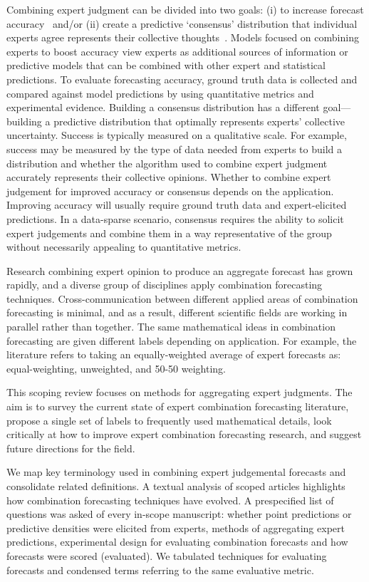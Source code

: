 \documentclass[preprint,authoryear]{elsarticle}
\begin{document}
Combining expert judgment can be divided into two goals: (i) to increase forecast accuracy~\cite{bates1969combination,granger1984improved} and/or (ii) create a predictive `consensus' distribution that individual experts agree represents their collective thoughts~\cite{stone1961opinion,genest1986combining,cooke1991experts}.
Models focused on combining experts to boost accuracy view experts as additional sources of information or predictive models that can be combined with other expert and statistical predictions.
To evaluate forecasting accuracy, ground truth data is collected and compared against model predictions by using quantitative metrics and experimental evidence.
Building a consensus distribution has a different goal---building a predictive distribution that optimally represents experts' collective uncertainty.
Success is typically measured on a qualitative scale.
For example, success may be measured by the type of data needed from experts to build a distribution and whether the algorithm used to combine expert judgment accurately represents their collective opinions.
Whether to combine expert judgement for improved accuracy or consensus depends on the application.
Improving accuracy will usually require ground truth data and expert-elicited predictions.
In a data-sparse scenario, consensus requires the ability to solicit expert judgements and combine them in a way representative of the group without necessarily appealing to quantitative metrics.

Research combining expert opinion to produce an aggregate forecast has grown rapidly, and a diverse group of disciplines apply combination forecasting techniques.
Cross-communication between different applied areas of combination forecasting is minimal, and as a result, different scientific fields are working in parallel rather than together.
The same mathematical ideas in combination forecasting are given different labels depending on application.
For example, the literature refers to taking an equally-weighted average of expert forecasts as: equal-weighting, unweighted, and 50-50 weighting.

This scoping review focuses on methods for aggregating expert judgments.
The aim is to survey the current state of expert combination forecasting literature, propose a single set of labels to frequently used mathematical details, look critically at how to improve expert combination forecasting research, and suggest future directions for the field. 

We map key terminology used in combining expert judgemental forecasts and consolidate related definitions.
A textual analysis of scoped articles highlights how combination forecasting techniques have evolved.
A prespecified list of questions was asked of every in-scope manuscript: whether point predictions or predictive densities were elicited from experts, methods of aggregating expert predictions, experimental design for evaluating combination forecasts and how forecasts were scored (evaluated).
We tabulated techniques for evaluating forecasts and condensed terms referring to the same evaluative metric.
\end{document}
